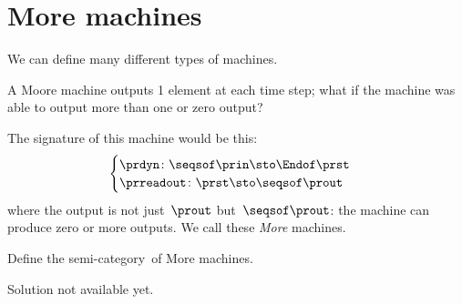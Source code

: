 

\section{More machines}



We can define many different types of machines.

A Moore machine outputs 1 element at each time step; what if the machine was able to output more than one or zero output?

The signature of this machine would be this:
%
\begin{equation}
    \label{eq:more-signature}
    \begin{cases}
        \prdyn \colon \seqsof\prin \sto \Endof \prst \\
        \prreadout \colon \prst \sto \seqsof \prout
    \end{cases}
\end{equation}
%
where the output is not just~$\prout$ but~$\seqsof \prout$: the machine can produce zero or more outputs.
We call these \emph{More} machines.

\begin{exercise}
    Define the semi-category~\More of More machines.
\end{exercise}
\begin{solution}
    \begin{publictodo}
        Solution not available yet.
    \end{publictodo}
\end{solution}



